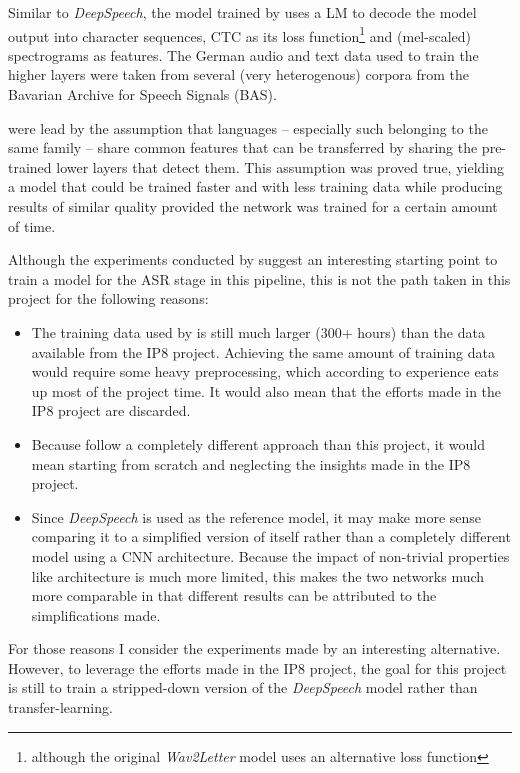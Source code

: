 Similar to \textit{DeepSpeech}, the model trained by \cite{budget} uses a \ac{LM} to decode the model output into character sequences, \ac{CTC} as its loss function\footnote{although the original \textit{Wav2Letter} model uses an alternative loss function} and (mel-scaled) spectrograms as features. The German audio and text data used to train the higher layers were taken from several (very heterogenous) corpora from the Bavarian Archive for Speech Signals (BAS). 

\cite{budget} were lead by the assumption that languages -- especially such belonging to the same family -- share common features that can be transferred by sharing the pre-trained lower layers that detect them. This assumption was proved true, yielding a model that could be trained faster and with less training data while producing results of similar quality provided the network was trained for a certain amount of time.

Although the experiments conducted by \cite{budget} suggest an interesting starting point to train a model for the \ac{ASR} stage in this pipeline, this is not the path taken in this project for the following reasons:

\begin{itemize}
	\item The training data used by \cite{budget} is still much larger (300+ hours) than the data available from the IP8 project. Achieving the same amount of training data would require some heavy preprocessing, which according to experience eats up most of the project time. It would also mean that the efforts made in the IP8 project are discarded.
	\item Because \cite{budget} follow a completely different approach than this project, it would mean starting from scratch and neglecting the insights made in the IP8 project.
	\item Since \textit{DeepSpeech} is used as the reference model, it may make more sense comparing it to a simplified version of itself rather than a completely different model using a \ac{CNN} architecture. Because the impact of non-trivial properties like architecture is much more limited, this makes the two networks much more comparable in that different results can be attributed to the simplifications made.
\end{itemize}

For those reasons I consider the experiments made by \cite{budget} an interesting alternative. However, to leverage the efforts made in the IP8 project, the goal for this project is still to train a stripped-down version of the \textit{DeepSpeech} model rather than transfer-learning.

